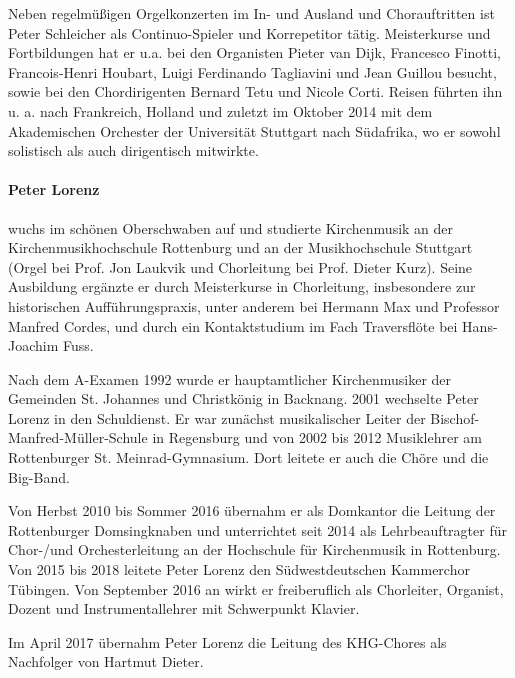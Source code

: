 \documentclass[a5paper,twoside,fontsize=11pt]{scrartcl}
\begin{document}
Neben regelmüßigen Orgelkonzerten im In- und Ausland und Chorauftritten ist Peter Schleicher als Continuo-Spieler und Korrepetitor tätig.
Meisterkurse und Fortbildungen hat er u.a. bei den Organisten Pieter van Dijk, Francesco Finotti, Francois-Henri Houbart, Luigi Ferdinando Tagliavini und Jean Guillou besucht, sowie bei den Chordirigenten Bernard Tetu und Nicole Corti.
Reisen führten ihn u. a. nach Frankreich, Holland und zuletzt im Oktober 2014 mit dem Akademischen Orchester der Universität Stuttgart nach Südafrika, wo er sowohl solistisch als auch dirigentisch mitwirkte.


\paragraph{Peter Lorenz} wuchs im schönen Oberschwaben auf und studierte Kirchenmusik an der Kirchenmusikhochschule Rottenburg und an der Musikhochschule Stuttgart (Orgel bei Prof. Jon Laukvik und Chorleitung bei Prof. Dieter Kurz).
Seine Ausbildung ergänzte er durch Meisterkurse in Chorleitung, insbesondere zur historischen Aufführungspraxis, unter anderem bei Hermann Max und Professor Manfred Cordes, und durch ein Kontaktstudium im Fach Traversflöte bei Hans-Joachim Fuss.

Nach dem A-Examen 1992 wurde er hauptamtlicher Kirchenmusiker der Gemeinden St. Johannes und Christkönig in Backnang.
2001 wechselte Peter Lorenz in den Schuldienst.
Er war zunächst musikalischer Leiter der Bischof-Manfred-Müller-Schule in Regensburg und von 2002 bis 2012 Musiklehrer am Rottenburger St. Meinrad-Gymnasium.
Dort leitete er auch die Chöre und die Big-Band.

Von Herbst 2010 bis Sommer 2016 übernahm er als Domkantor die Leitung der Rottenburger Domsingknaben und unterrichtet seit 2014 als Lehrbeauftragter für Chor-/und Orchesterleitung an der Hochschule für Kirchenmusik in Rottenburg.
Von 2015 bis 2018 leitete Peter Lorenz den Südwestdeutschen Kammerchor Tübingen.
Von September 2016 an wirkt er freiberuflich als Chorleiter, Organist, Dozent und Instrumentallehrer mit Schwerpunkt Klavier.

Im April 2017 übernahm Peter Lorenz die Leitung des KHG-Chores als Nachfolger von Hartmut Dieter.
\end{document}
